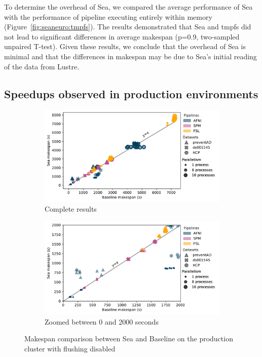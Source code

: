 \documentclass[fleqn,10pt]{wlscirep}
\begin{document}
To determine the overhead of Sea, we compared the average performance of Sea with
the performance of pipeline executing entirely within memory
(Figure~\ref{fig:seaneuro:tmpfs}). The results demonstrated that Sea and tmpfs
did not lead to significant differences in average makespan (p=0.9, two-sampled unpaired T-test). Given these results, we conclude that the
overhead of Sea is minimal and that the differences in makespan may be
due to Sea's initial reading of the data from Lustre.


\subsection{Speedups observed in production environments}

\begin{figure}

\begin{subfigure}{0.5\textwidth}
    \centering
    \captionsetup{width=.85\linewidth}
    \includegraphics[width=\columnwidth]{figures/beluga_withoutflush_nozoom.pdf}%
    \caption{Complete results}\label{fig:seaneuro:belugafull}
\end{subfigure}
\begin{subfigure}{0.5\textwidth}
    \centering
    \captionsetup{width=.85\linewidth}
    \includegraphics[width=\linewidth]{figures/beluga_withoutflush_zoom.pdf}
    \caption{Zoomed between 0 and 2000 seconds}\label{fig:seaneuro:belugazoom}
\end{subfigure}
\caption{Makespan comparison between Sea and Baseline on the production cluster with flushing disabled}
\label{fig:seaneuro:beluga-noflush}
\end{figure}
\end{document}
